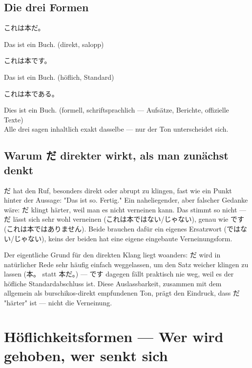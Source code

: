 \documentclass[12pt]{book}
\begin{document}
\section*{Die drei Formen}

\par\quad これは本だ。\\
\par\quad Das ist ein Buch. (direkt, salopp)\\

\par\quad これは本です。\\
\par\quad Das ist ein Buch. (höflich, Standard)\\

\par\quad これは本である。\\
\par\quad Dies ist ein Buch. (formell, schriftsprachlich — Aufsätze, Berichte, offizielle Texte)\\

Alle drei sagen inhaltlich exakt dasselbe — nur der Ton unterscheidet sich.

\section*{Warum だ direkter wirkt, als man zunächst denkt}

だ hat den Ruf, besonders direkt oder abrupt zu klingen, fast wie ein Punkt hinter der Aussage: "Das ist so. Fertig." Ein naheliegender, aber falscher Gedanke wäre: だ klingt härter, weil man es nicht verneinen kann. Das stimmt so nicht — だ lässt sich sehr wohl verneinen (これは本ではない/じゃない), genau wie です (これは本ではありません). Beide brauchen dafür ein eigenes Ersatzwort (ではない/じゃない), keins der beiden hat eine eigene eingebaute Verneinungsform.

Der eigentliche Grund für den direkten Klang liegt woanders: だ wird in natürlicher Rede sehr häufig einfach weggelassen, um den Satz weicher klingen zu lassen (本。 statt 本だ。) — です dagegen fällt praktisch nie weg, weil es der höfliche Standardabschluss ist. Diese Auslassbarkeit, zusammen mit dem allgemein als burschikos-direkt empfundenen Ton, prägt den Eindruck, dass だ "härter" ist — nicht die Verneinung.


\chapter{Höflichkeitsformen — Wer wird gehoben, wer senkt sich}
\end{document}

